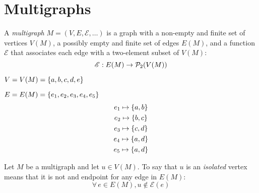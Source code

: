\documentclass[letterpaper,12pt,fleqn]{article}
\newcommand{\E}{\mathscr{E}}
\begin{document}
\section*{Multigraphs}

\begin{definition}[Multigraph]
  A \emph{multigraph} \(M=(V,E,\E,\ldots)\) is a graph with a non-empty and finite set of vertices \(V(M)\), a
  possibly empty and finite set of edges \(E(M)\), and a function \(\E\) that associates each edge with a two-element
  subset of \(V(M)\):
  \[\E:E(M)\to\ps_2(V(M))\]
\end{definition}

\begin{example}
  \begin{minipage}[t]{3in}
    \vspace{0cm}
  \end{minipage}
  \begin{minipage}[t]{3.25in}
    \vspace{0.1in}
    \(V=V(M)=\{a,b,c,d,e\}\)

    \(E=E(M)=\{e_1,e_2,e_3,e_4,e_5\}\)
    \begin{gather*}
      e_1\mapsto\{a,b\} \\
      e_2\mapsto\{b,c\} \\
      e_3\mapsto\{c,d\} \\
      e_4\mapsto\{a,d\} \\
      e_5\mapsto\{a,d\}
    \end{gather*}
  \end{minipage}
\end{example}

\begin{definition}
  Let \(M\) be a multigraph and let \(u\in V(M)\).  To say that \(u\) is an \emph{isolated} vertex means that
  it is not and endpoint for any edge in \(E(M)\):
  \[\forall\,e\in E(M),u\notin\E(e)\]
\end{definition}
\end{document}
